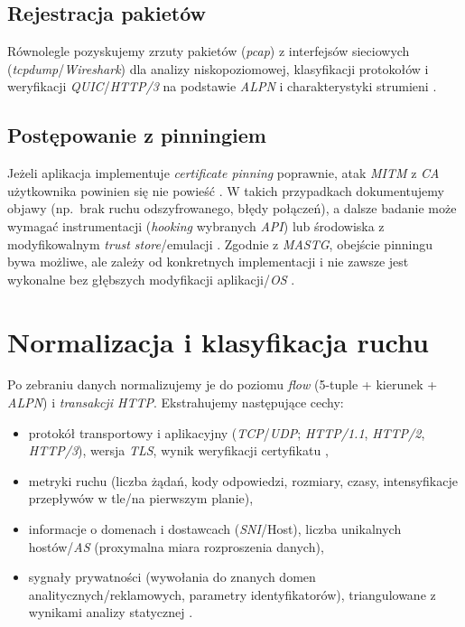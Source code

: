 \subsection{Rejestracja pakietów}
Równolegle pozyskujemy zrzuty pakietów (\textit{pcap}) z interfejsów sieciowych (\textit{tcpdump}/\textit{Wireshark}) dla analizy niskopoziomowej, klasyfikacji protokołów i weryfikacji \emph{QUIC}/\emph{HTTP/3} na podstawie \emph{ALPN} i charakterystyki strumieni \cite{WiresharkDocs,RFC9000,RFC9114}.

\subsection{Postępowanie z pinningiem}
Jeżeli aplikacja implementuje \emph{certificate pinning} poprawnie, atak \emph{MITM} z \emph{CA} użytkownika powinien się nie powieść \cite{OWASPMASTGPinning}. W takich przypadkach dokumentujemy objawy (np.\ brak ruchu odszyfrowanego, błędy połączeń), a dalsze badanie może wymagać instrumentacji (\emph{hooking} wybranych \emph{API}) lub środowiska z modyfikowalnym \emph{trust store}/emulacji \cite{OWASPMASTGPinning,OWASPMASTGIntercept}. Zgodnie z \emph{MASTG}, obejście pinningu bywa możliwe, ale zależy od konkretnych implementacji i nie zawsze jest wykonalne bez głębszych modyfikacji aplikacji/\emph{OS} \cite{OWASPMASTGPinning}.

\section{Normalizacja i klasyfikacja ruchu}
Po zebraniu danych normalizujemy je do poziomu \emph{flow} (5-tuple + kierunek + \emph{ALPN}) i \emph{transakcji HTTP}. Ekstrahujemy następujące cechy:
\begin{itemize}
  \item protokół transportowy i aplikacyjny (\emph{TCP}/\emph{UDP}; \emph{HTTP/1.1}, \emph{HTTP/2}, \emph{HTTP/3}), wersja \emph{TLS}, wynik weryfikacji certyfikatu \cite{RFC8446,RFC9113,RFC9114},
  \item metryki ruchu (liczba żądań, kody odpowiedzi, rozmiary, czasy, intensyfikacje przepływów w tle/na pierwszym planie),
  \item informacje o domenach i dostawcach (\emph{SNI}/Host), liczba unikalnych hostów/\emph{AS} (proxymalna miara rozproszenia danych),
  \item sygnały prywatności (wywołania do znanych domen analitycznych/reklamowych, parametry identyfikatorów), triangulowane z wynikami analizy statycznej \cite{ExodusPrivacy}.
\end{itemize}

